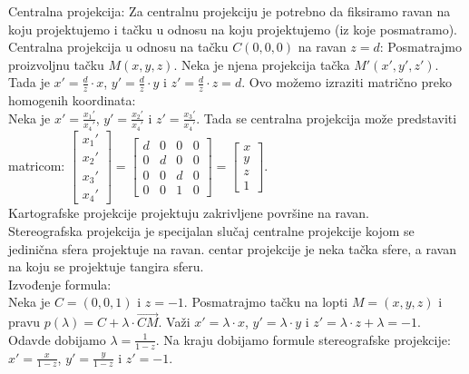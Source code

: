 \documentclass[12pt]{article}
\begin{document}
    Centralna projekcija: Za centralnu projekciju je potrebno
    da fiksiramo ravan na koju projektujemo i tačku u odnosu
    na koju projektujemo (iz koje posmatramo).\\
    Centralna projekcija u odnosu na tačku $C(0,0,0)$ na ravan $z=d$:
    Posmatrajmo proizvoljnu tačku $M(x,y,z)$. Neka je njena projekcija tačka $M'(x',y',z')$.
    Tada je $x'=\frac{d}{z}\cdot x$, $y'=\frac{d}{z}\cdot y$ i $z'=\frac{d}{z}\cdot z=d$.
    Ovo možemo izraziti matrično preko homogenih koordinata:\\
    Neka je $x'=\frac{x_1'}{x_4'}$, $y'=\frac{x_2'}{x_4'}$ i $z'=\frac{x_3'}{x_4'}$.
    Tada se centralna projekcija može predstaviti matricom:
$\begin{bmatrix}
    x_1' \\
    x_2' \\
    x_3' \\
    x_4'
\end{bmatrix}=\begin{bmatrix}
    d & 0 & 0 & 0 \\
    0 & d & 0 & 0 \\
    0 & 0 & d & 0 \\
    0 & 0 & 1 & 0
\end{bmatrix}=\begin{bmatrix}
    x \\
    y \\
    z \\
    1
\end{bmatrix}$.\\
    Kartografske projekcije projektuju zakrivljene površine na
    ravan.\\
    Stereografska projekcija je specijalan slučaj centralne
    projekcije kojom se jedinična sfera projektuje na ravan.
    centar projekcije je neka tačka sfere, a ravan na koju se
    projektuje tangira sferu.\\
    Izvođenje formula:\\
    Neka je $C=(0,0,1)$ i $z=-1$. Posmatrajmo tačku na lopti
$M=(x,y,z)$ i pravu $p(\lambda)=C+\lambda\cdot\overrightarrow{CM}$.
    Važi $x'=\lambda\cdot x$, $y'=\lambda\cdot y$ i $z'=\lambda\cdot z+\lambda=-1$.
    Odavde dobijamo $\lambda=\frac{1}{1-z}$. Na kraju dobijamo formule stereografske
    projekcije:
$x'=\frac{x}{1-z}$, $y'=\frac{y}{1-z}$ i $z'=-1$.
    \par
\end{document}
